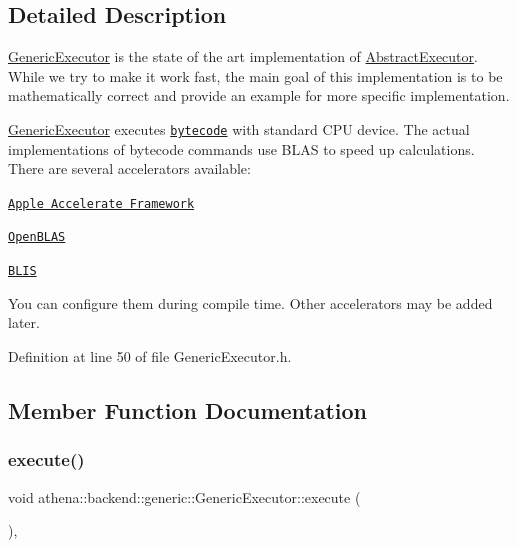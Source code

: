 \subsection{Detailed Description}
\mbox{\hyperlink{classathena_1_1backend_1_1generic_1_1_generic_executor}{Generic\+Executor}} is the state of the art implementation of \mbox{\hyperlink{classathena_1_1backend_1_1_abstract_executor}{Abstract\+Executor}}. While we try to make it work fast, the main goal of this implementation is to be mathematically correct and provide an example for more specific implementation. 

\mbox{\hyperlink{classathena_1_1backend_1_1generic_1_1_generic_executor}{Generic\+Executor}} executes \href{https://athenaframework.ml/athena/bytecode/basics.html}{\tt bytecode} with standard C\+PU device. The actual implementations of bytecode commands use B\+L\+AS to speed up calculations. There are several accelerators available\+: 
\begin{DoxyItemize}
\item \href{https://developer.apple.com/documentation/accelerate}{\tt Apple Accelerate Framework}  
\item \href{https://github.com/xianyi/OpenBLAS.git}{\tt Open\+B\+L\+AS}  
\item \href{https://github.com/flame/blis.git}{\tt B\+L\+IS}  
\end{DoxyItemize}You can configure them during compile time. Other accelerators may be added later. 

Definition at line 50 of file Generic\+Executor.\+h.



\subsection{Member Function Documentation}
\mbox{\label{classathena_1_1backend_1_1generic_1_1_generic_executor_a38b56c284050d31198b28fcb6595bc73}} 
\subsubsection{\texorpdfstring{execute()}{execute()}}
{\footnotesize\ttfamily void athena\+::backend\+::generic\+::\+Generic\+Executor\+::execute (\begin{DoxyParamCaption}{ }\end{DoxyParamCaption})\hspace{0.3cm}{\ttfamily [override]}, {\ttfamily [virtual]}}

